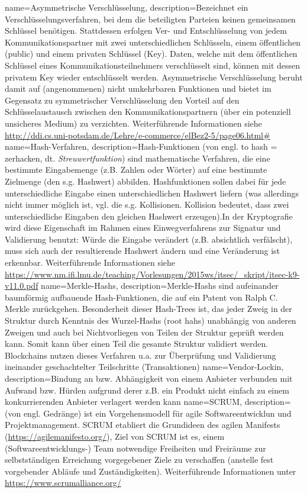 {
    name=Asymmetrische Verschlüsselung,
    description={Bezeichnet ein Verschlüsselungsverfahren, bei dem die beteiligten Parteien keinen gemeinsamen Schlüssel benötigen. Stattdessen erfolgen Ver- und Entschlüsselung von jedem Kommunikationspartner mit zwei unterschiedlichen Schlüsseln, einem öffentlichen (public) und einem privaten Schlüssel (Key). Daten, welche mit dem öffentlichen Schlüssel eines Kommunikationsteilnehmers verschlüsselt sind, können mit dessen privatem Key wieder entschlüsselt werden. Asymmetrische Verschlüsselung beruht damit auf (angenommenen) nicht umkehrbaren Funktionen und bietet im Gegensatz zu symmetrischer Verschlüsselung den Vorteil auf den Schlüsselaustausch zwischen den Kommunikationspartnern (über ein potenziell unsicheres Medium) zu verzichten. Weiterführende Informationen siehe \url{http://ddi.cs.uni-potsdam.de/Lehre/e-commerce/elBez2-5/page06.html\#}}
}
{
    name=Hash-Verfahren,
    description={Hash-Funktionen (von engl. \glqq{}to hash\grqq{} = zerhacken, dt. \textit{Streuwertfunktion}) sind mathematische Verfahren, die eine bestimmte Eingabemenge (z.B. Zahlen oder Wörter) auf eine bestimmte Zielmenge (den s.g. Hashwert) abbilden. Hashfunktionen sollen dabei für jede unterschiedliche Eingabe einen unterschiedlichen Hashwert liefern (was allerdings nicht immer möglich ist, vgl. die s.g. Kollisionen. Kollision bedeutet, dass zwei unterschiedliche Eingaben den gleichen Hashwert erzeugen).In der Kryptografie wird diese Eigenschaft im Rahmen eines Einwegverfahrens zur Signatur und Validierung benutzt: Würde die Eingabe verändert (z.B. absichtlich verfälscht), muss sich auch der resultierende Hashwert ändern und eine Veränderung ist erkennbar. Weiterführende Informationen siehe \url{https://www.nm.ifi.lmu.de/teaching/Vorlesungen/2015ws/itsec/_skript/itsec-k9-v11.0.pdf}}
}
{
    name=Merkle-Hashs,
    description={Merkle-Hashs sind aufeinander baumförmig aufbauende Hash-Funktionen, die auf ein Patent von Ralph C. Merkle zurückgehen. Besonderheit dieser \glqq{}Hash-Trees\grqq{} ist, das jeder Zweig in der Struktur durch Kenntnis des Wurzel-Hashs (\glqq{}root hahs\grqq{}) unabhängig von anderen Zweigen und auch bei Nichtvorliegen von Teilen der Struktur geprüft werden kann. Somit kann über einen Teil die gesamte Struktur validiert werden. Blockchains nutzen dieses Verfahren u.a. zur Überprüfung und Validierung ineinander geschachtelter Teilschritte (Transaktionen)}
}
{
    name=Vendor-Lockin,
    description={Bindung an bzw. Abhängigkeit von einem Anbieter verbunden mit Aufwand bzw. Hürden aufgrund derer z.B. ein Produkt nicht einfach zu einem konkurrierenden Anbieter verlagert werden kann}
}
{
    name=SCRUM,
    description={(von engl. \glqq{}Gedränge\grqq{}) ist ein Vorgehensmodell für agile Softwareentwicklun und Projektmanagement. SCRUM etabliert die Grundideen des agilen Manifests (\url{https://agilemanifesto.org/}), Ziel von SCRUM ist es, einem (Softwareentwicklungs-) Team notwendige Freiheiten und Freiräume zur selbstständigen Erreichung vorgegebener Ziele zu verschaffen (anstelle fest vorgebender Abläufe und Zuständigkeiten). Weiterführende Informationen unter \url{https://www.scrumalliance.org/}}
}


